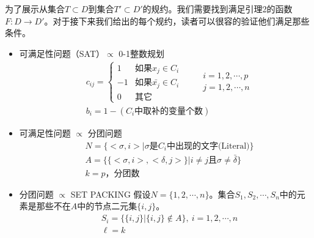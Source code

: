 \documentclass[twocolumn]{article}
\theoremstyle{nonumberplain}%
\begin{document}
\begin{CJK}{UTF8}{gbsn}
    为了展示从集合$T\subset D$到集合$T'\subset D'$的规约。我们需要找到满足引理2的函数$F:D\rightarrow D'$。对于接下来我们给出的每个规约，读者可以很容的验证他们满足那些条件。
    \begin{itemize}
    \item 可满足性问题（SAT）$\propto$ 0-1整数规划
        \begin{equation}\nonumber %
        \begin{aligned}
            &c_{ij}=\left\{
            \begin{matrix}
              1 & \text{如果}x_j\in C_i \\
              -1 & \text{如果}\bar{x_j}\in C_i \\
              0 & \text{其它}
            \end{matrix}
            \right.
            \qquad
            \begin{matrix}
              i=1,2,\cdots,p\\
              j=1,2,\cdots,n
            \end{matrix}
            \\
            &b_i=1-(C_i\text{中取补的变量个数})
        \end{aligned}
        \end{equation}
        
    \item 可满足性问题 $\propto$ 分团问题
        \begin{equation}\nonumber %
        \begin{aligned}
        & N = \{<\sigma,i>|\sigma\text{是}C_i\text{中出现的文字(Literal)}\} \\
        & A = \{\{<\sigma,i>,<\delta,j>\}|i\neq j\text{且}\sigma\neq\bar{\delta}\} \\
        & k = p\text{，分团数}
        \end{aligned}
        \end{equation}

    \item 分团问题 $\propto$ SET PACKING
        假设$N=\{1,2,\cdots,n\}$。集合$S_1,S_2,\cdots,S_n$中的元素是那些不在$A$中的节点二元集$\{i,j\}$。
        \begin{equation}\nonumber %
        \begin{aligned}
        & S_i=\{\{i,j\}|\{i,j\}\notin A\},\ i=1,2,\cdots,n\\
        & \ell=k
        \end{aligned}
        \end{equation}


\end{itemize}
\end{CJK}
\end{document}
